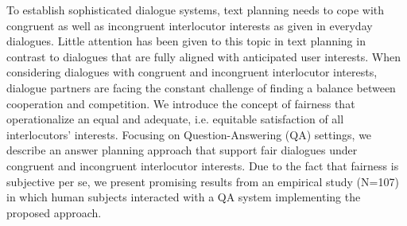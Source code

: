 To establish sophisticated dialogue systems, text planning needs to cope with congruent as well as incongruent interlocutor interests as given in everyday dialogues. Little attention has been given to this topic in text planning in contrast to dialogues that are fully aligned with anticipated user interests. When considering dialogues with congruent and incongruent interlocutor interests, dialogue partners are facing the constant challenge of finding a balance between cooperation and competition. We introduce the concept of fairness that operationalize an equal and adequate, i.e. equitable satisfaction of all interlocutors' interests. Focusing on Question-Answering (QA) settings, we describe an answer planning approach that support fair dialogues under congruent and incongruent interlocutor interests. Due to the fact that fairness is subjective per se, we present promising results from an empirical study (N=107) in which human subjects interacted with a QA system implementing the proposed approach.
